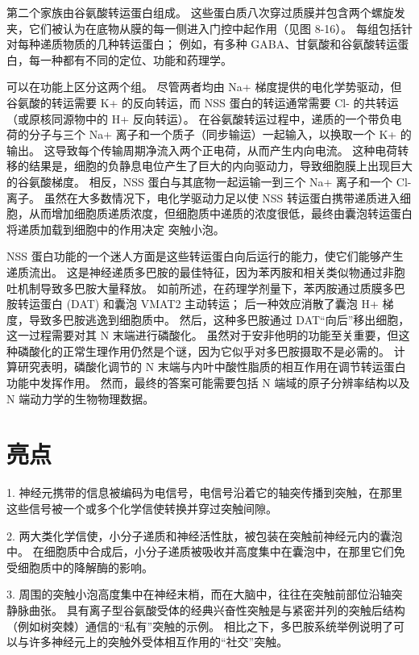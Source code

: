 第二个家族由谷氨酸转运蛋白组成。 这些蛋白质八次穿过质膜并包含两个螺旋发夹，它们被认为在底物从膜的每一侧进入门控中起作用（见图 8-16）。 每组包括针对每种递质物质的几种转运蛋白； 例如，有多种 GABA、甘氨酸和谷氨酸转运蛋白，每一种都有不同的定位、功能和药理学。

可以在功能上区分这两个组。 尽管两者均由 Na+ 梯度提供的电化学势驱动，但谷氨酸的转运需要 K+ 的反向转运，而 NSS 蛋白的转运通常需要 Cl- 的共转运（或原核同源物中的 H+ 反向转运）。 在谷氨酸转运过程中，递质的一个带负电荷的分子与三个 Na+ 离子和一个质子（同步输运）一起输入，以换取一个 K+ 的输出。 这导致每个传输周期净流入两个正电荷，从而产生内向电流。 这种电荷转移的结果是，细胞的负静息电位产生了巨大的内向驱动力，导致细胞膜上出现巨大的谷氨酸梯度。 相反，NSS 蛋白与其底物一起运输一到三个 Na+ 离子和一个 Cl- 离子。 虽然在大多数情况下，电化学驱动力足以使 NSS 转运蛋白携带递质进入细胞，从而增加细胞质递质浓度，但细胞质中递质的浓度很低，最终由囊泡转运蛋白将递质加载到细胞中的作用决定 突触小泡。

NSS 蛋白功能的一个迷人方面是这些转运蛋白向后运行的能力，使它们能够产生递质流出。 这是神经递质多巴胺的最佳特征，因为苯丙胺和相关类似物通过非胞吐机制导致多巴胺大量释放。 如前所述，在药理学剂量下，苯丙胺通过质膜多巴胺转运蛋白 (DAT) 和囊泡 VMAT2 主动转运； 后一种效应消散了囊泡 H+ 梯度，导致多巴胺逃逸到细胞质中。 然后，这种多巴胺通过 DAT“向后”移出细胞，这一过程需要对其 N 末端进行磷酸化。 虽然对于安非他明的功能至关重要，但这种磷酸化的正常生理作用仍然是个谜，因为它似乎对多巴胺摄取不是必需的。 计算研究表明，磷酸化调节的 N 末端与内叶中酸性脂质的相互作用在调节转运蛋白功能中发挥作用。 然而，最终的答案可能需要包括 N 端域的原子分辨率结构以及 N 端动力学的生物物理数据。


\section{亮点}

1. 神经元携带的信息被编码为电信号，电信号沿着它的轴突传播到突触，在那里这些信号被一个或多个化学信使转换并穿过突触间隙。 

2. 两大类化学信使，小分子递质和神经活性肽，被包装在突触前神经元内的囊泡中。 在细胞质中合成后，小分子递质被吸收并高度集中在囊泡中，在那里它们免受细胞质中的降解酶的影响。 

3. 周围的突触小泡高度集中在神经末梢，而在大脑中，往往在突触前部位沿轴突静脉曲张。 具有离子型谷氨酸受体的经典兴奋性突触是与紧密并列的突触后结构（例如树突棘）通信的“私有”突触的示例。 相比之下，多巴胺系统举例说明了可以与许多神经元上的突触外受体相互作用的“社交”突触。 

